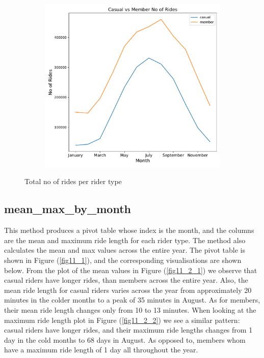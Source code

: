\documentclass[12pt]{article}
\begin{document}
\begin{figure}[h]
\begin{subfigure}{.6\textwidth}
		\includegraphics[scale=0.46]{no_of_rides.pdf}
	\end{subfigure}
	\caption{Total no of rides per rider type}
	\label{fig17}
	\end{figure}
	
\subsection{mean\_max\_by\_month}	
	This method produces a pivot table whose index is the month, and the columns are the mean and maximum ride length for each rider type. The method also calculates the mean and max values across the entire year. The pivot table is shown in Figure (\ref{fig11_1}), and the corresponding visualisations are shown below. From the plot of the mean values in Figure (\ref{fig11_2_1}) we observe that casual riders have longer rides, than members across the entire year. Also, the mean ride length for casual riders varies across the year from approximately 20 minutes in the colder months to a peak of 35 minutes in August. As for members, their mean ride length changes only from 10 to 13 minutes. When looking at the maximum ride length plot in Figure (\ref{fig11_2_2}) we see a similar pattern: casual riders have longer rides, and their maximum ride lengths changes from 1 day in the cold months to 68 days in August. As opposed to, members whom have a maximum ride length of 1 day all throughout the year.\\
	
\end{document}
